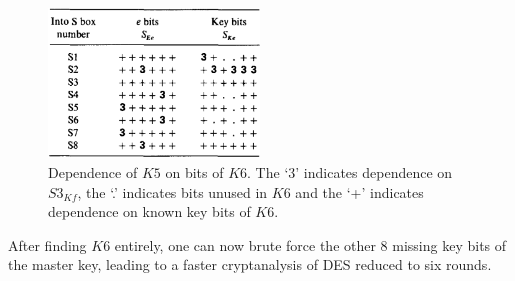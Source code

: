 \documentclass[twoside]{article}
\begin{document}
\begin{figure}[!ht]
    \centering
    \includegraphics[width=0.5\textwidth]{images/des_k5.png}
    \caption{Dependence of \(K5\) on bits of \(K6\). The `3' indicates 
    dependence on \(S3_{Kf}\), the `.' indicates bits unused in \(K6\) and the 
    `+' indicates dependence on known key bits of \(K6\).}
    \label{fig:des-k5}
\end{figure}

After finding \(K6\) entirely, one can now brute force the other 8 missing key 
bits of the master key, leading to a faster cryptanalysis of DES reduced to 
six rounds.
\end{document}
